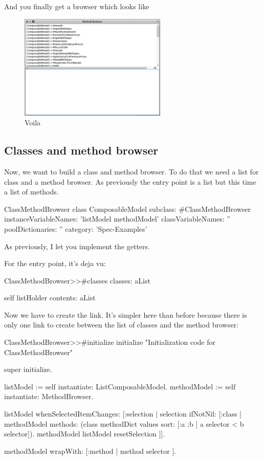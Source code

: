 \documentclass[a4paper,10pt,twoside]{book}
\begin{document}
And you finally get a browser which looks like 
\begin{figure}[ht]
\begin{center}
	\includegraphics[width=7cm]{MethodBrowser5}
	\caption{Voila}
\end{center}
\end{figure}

\subsection{Classes and method browser}

Now, we want to build a class and method browser. To do that we need a list for class and a method browser. As previously the entry point is a list but this time a list of methods.

\begin{classdef}{ClassMethodBrowser class}
ComposableModel subclass: #ClassMethodBrowser
	instanceVariableNames: 'listModel methodModel'
	classVariableNames: ''
	poolDictionaries: ''
	category: 'Spec-Examples'
\end{classdef}

As previously, I let you implement the getters.

For the entry point, it's deja vu: 
\begin{method}{ClassMethodBrowser>>\#classes}
classes: aList

	self listHolder contents: aList
\end{method}

Now we have to create the link. It's simpler here than before because there is only one link to create between the list of classes and the method browser:

\begin{method}{ClassMethodBrowser>>\#initialize}
initialize
	"Initialization code for ClassMethodBrowser"

	super initialize.

	listModel := self instantiate: ListComposableModel.
	methodModel := self instantiate: MethodBrowser.
	
	listModel whenSelectedItemChanges: [:selection |
		selection 
			ifNotNil: [:class | 
				methodModel methods: (class methodDict values sort: [:a :b | a selector < b selector]).
				methodModel listModel resetSelection ]].
	
	methodModel wrapWith: [:method | method selector ].
\end{method}
\end{document}
